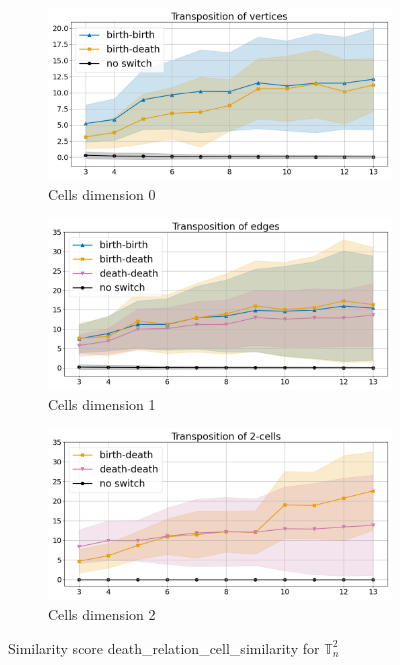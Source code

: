\documentclass{article}
\begin{document}
\begin{figure}[htbp]
\centering
\begin{subfigure}[b]{0.3\textwidth}
    \includegraphics[width=\linewidth]{pics/torus-transpositions-extended/score-death-relation-cell-similarity-complex-dim2-transpositions-dim0.png}
    \caption{Cells dimension 0}
    \label{fig:deathrelationcellsimilaritycomplex2cells0}
\end{subfigure}
\hfill
\begin{subfigure}[b]{0.3\textwidth}
    \includegraphics[width=\linewidth]{pics/torus-transpositions-extended/score-death-relation-cell-similarity-complex-dim2-transpositions-dim1.png}
    \caption{Cells dimension 1}
    \label{fig:deathrelationcellsimilaritycomplex2cells1}
\end{subfigure}
\hfill
\begin{subfigure}[b]{0.3\textwidth}
    \includegraphics[width=\linewidth]{pics/torus-transpositions-extended/score-death-relation-cell-similarity-complex-dim2-transpositions-dim2.png}
    \caption{Cells dimension 2}
    \label{fig:deathrelationcellsimilaritycomplex2cells2}
\end{subfigure}
\caption{Similarity score death\_relation\_cell\_similarity for $\mathbb{T}_n^{2}$}
\label{fig:deathrelationcellsimilaritycomplex2}
\end{figure}
\end{document}
